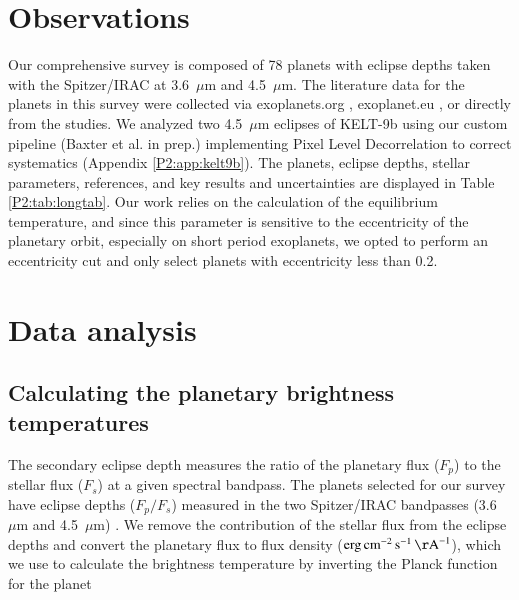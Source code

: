 
\section{Observations}
\label{P2:sec:obs}

Our comprehensive survey is composed of 78 planets with eclipse depths taken with the Spitzer/IRAC at 3.6~$\mu$m and 4.5~$\mu$m.
The literature data for the planets in this survey were collected via exoplanets.org \citep{Han2014}, exoplanet.eu \citep{Schneider2011}, or directly from the studies. We analyzed two 4.5~$\mu$m eclipses of KELT-9b \citep{Mansfield2020} using our custom pipeline (Baxter et al. in prep.) implementing Pixel Level Decorrelation to correct systematics \citep{Deming2015} (Appendix \ref{P2:app:kelt9b}). The planets, eclipse depths, stellar parameters, references, and key results and uncertainties are displayed in Table \ref{P2:tab:longtab}.
Our work relies on the calculation of the equilibrium temperature, and since this parameter is sensitive to the eccentricity of the planetary orbit, especially on short period exoplanets, we  opted to perform an eccentricity cut and only select planets with eccentricity less than 0.2.


\section{Data analysis}
\label{P2:sec:data}

\subsection{Calculating the planetary brightness temperatures}
\label{P2:app:Tbcalc}

The secondary eclipse depth measures the ratio of the planetary flux ($F_p$) to the stellar flux ($F_s$) at a given spectral bandpass. The planets selected for our survey have eclipse depths ($F_p/F_s$) measured in the two Spitzer/IRAC bandpasses (3.6~$\mu$m and 4.5~$\mu$m) \citep{Werner2004}. We remove the contribution of the stellar flux from the eclipse depths and convert the planetary flux to flux density ($\si{erg.cm^{-2}.s^{-1}.\AA^{-1}}$), which we use to calculate the brightness temperature by inverting the Planck function for the planet

